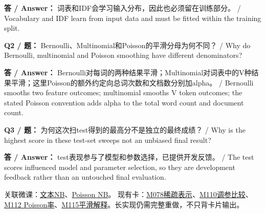 \textbf{答 / Answer：} 词表和IDF会学习输入分布，因此也必须留在训练部分。 / Vocabulary and IDF learn from input data and must be fitted within the training split.

\textbf{Q2 / 题：} Bernoulli、Multinomial和Poisson的平滑分母为何不同？ / Why do Bernoulli, multinomial and Poisson smoothing have different denominators?

\textbf{答 / Answer：} Bernoulli对每词的两种结果平滑；Multinomial对词表中的V种结果平滑；这里Poisson的额外约定向总词次数和文档数分别加alpha。 / Bernoulli smooths two feature outcomes; multinomial smooths V token outcomes; the stated Poisson convention adds alpha to the total word count and document count.

\textbf{Q3 / 题：} 为何这次扫test得到的最高分不是独立的最终成绩？ / Why is the highest score in these test-set sweeps not an unbiased final result?

\textbf{答 / Answer：} test表现参与了模型和参数选择，已提供开发反馈。 / The test scores influenced model and parameter selection, so they are development feedback rather than an untouched final evaluation.


关联微课：\href{https://crazyshout.github.io/micro-course/?lesson=ml08}{文本NB}、\href{https://crazyshout.github.io/micro-course/?lesson=ml09}{Poisson NB}。
现有卡：\href{https://crazyshout.github.io/micro-course/cards.html\#CS5489-M078}{M078稀疏表示}、\href{https://crazyshout.github.io/micro-course/cards.html\#CS5489-M110}{M110调参比较}、\href{https://crazyshout.github.io/micro-course/cards.html\#CS5489-M112}{M112 Poisson率}、\href{https://crazyshout.github.io/micro-course/cards.html\#CS5489-M115}{M115平滑解释}。长实现仍需完整重做，不只背卡片输出。





